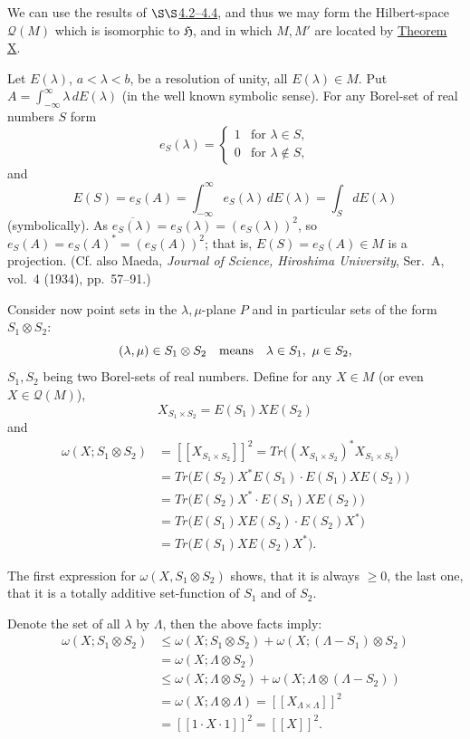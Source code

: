 \documentclass[twoside,leqno]{article}
\newcommand{\Tr}{Tr}
\newcommand{\cH}{\mathfrak{H}}
\newcommand{\Q}{\mathcal{Q}}
\newcommand{\StatementRef}[2]{\hyperlink{stmt:#1}{#2}}
\begin{document}
We can use the results of \hyperlink{sec:4.2}{\(\S\S\)4.2}\hyperlink{sec:4.4}{--4.4}, and thus we may form the
Hilbert-space \(\Q(M)\) which is isomorphic to \(\cH\), and in which
\(M,M'\) are located by \StatementRef{thm:X}{Theorem X}.

Let \(E(\lambda)\), \(a<\lambda<b\), be a resolution of unity, all
\(E(\lambda)\in M\). Put
\(A=\int_{-\infty}^{\infty}\lambda\,dE(\lambda)\)
(in the well known symbolic sense). For any Borel-set of real numbers \(S\)
form
\[
 e_S(\lambda)=
 \begin{cases}
  1&\text{for }\lambda\in S,\\
  0&\text{for }\lambda\notin S,
 \end{cases}
\]
and
\[
 E(S)=e_S(A)=\int_{-\infty}^{\infty}e_S(\lambda)\,dE(\lambda)
             =\int_S dE(\lambda)
\]
(symbolically). As
$\overline{e_S(\lambda)}=e_S(\lambda)=(e_S(\lambda))^2$,
so \(e_S(A)=e_S(A)^*=(e_S(A))^2\); that is, \(E(S)=e_S(A)\in M\) is a
projection. (Cf. also Maeda, \textit{Journal of Science, Hiroshima
University}, Ser.\ A, vol.\ 4 (1934), pp.\ 57--91.)

Consider now point sets in the \(\lambda,\mu\)-plane \(P\) and in
particular sets of the form \(S_1\otimes S_2\):
\[
 (\lambda,\mu)\in S_1\otimes S_2
 \quad\hbox{means}\quad
 \lambda\in S_1,\ \mu\in S_2,
\]
\(S_1,S_2\) being two Borel-sets of real numbers. Define for any \(X\in M\)
(or even \(X\in\Q(M)\)),
\[
 X_{S_1\times S_2}=E(S_1)XE(S_2)
\]
and
\begin{align*}
 \omega(X;S_1\otimes S_2)
  &=[\![X_{S_1\times S_2}]\!]^2
    =\Tr\bigl((X_{S_1\times S_2})^*X_{S_1\times S_2}\bigr)\\
  &=\Tr\bigl(E(S_2)X^*E(S_1)\cdot E(S_1)XE(S_2)\bigr)\\
  &=\Tr\bigl(E(S_2)X^*\cdot E(S_1)XE(S_2)\bigr)\\
  &=\Tr\bigl(E(S_1)XE(S_2)\cdot E(S_2)X^*\bigr)\\
  &=\Tr\bigl(E(S_1)XE(S_2)X^*\bigr).
\end{align*}

The first expression for \(\omega(X,S_1\otimes S_2)\) shows, that it is
always \(\geq0\), the last one, that it is a totally additive set-function
of \(S_1\) and of \(S_2\).

Denote the set of all \(\lambda\) by \(\Lambda\), then the above facts imply:
\begin{align*}
 \omega(X;S_1\otimes S_2)
 &\leq\omega(X;S_1\otimes S_2)
       +\omega(X;(\Lambda-S_1)\otimes S_2)\\
 &=\omega(X;\Lambda\otimes S_2)\\
 &\leq\omega(X;\Lambda\otimes S_2)
       +\omega(X;\Lambda\otimes(\Lambda-S_2))\\
 &=\omega(X;\Lambda\otimes\Lambda)
   =[\![X_{\Lambda\times\Lambda}]\!]^2\\
 &=[\![1\cdot X\cdot1]\!]^2=[\![X]\!]^2.
\end{align*}
\end{document}
